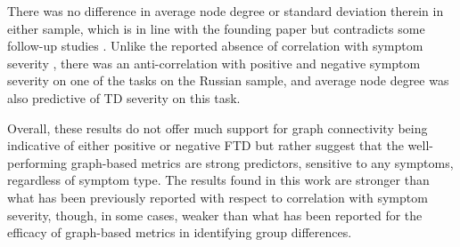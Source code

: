 There was no difference in average node degree or standard deviation therein in either sample, which is in line with the founding paper \citep{mota2012speech} but contradicts some follow-up studies \citep{mota2014graph, nikzad2022does}. Unlike the reported absence of correlation with symptom severity \citep{mota2012speech, mota2014graph, nikzad2022does}, there was an anti-correlation with positive and negative symptom severity on one of the tasks on the Russian sample, and average node degree was also predictive of TD severity on this task. 

Overall, these results do not offer much support for graph connectivity being indicative of either positive or negative FTD but rather suggest that the well-performing graph-based metrics are strong predictors, sensitive to any symptoms, regardless of symptom type. The results found in this work are stronger than what has been previously reported with respect to correlation with symptom severity, though, in some cases, weaker than what has been reported for the efficacy of graph-based metrics in identifying group differences.





